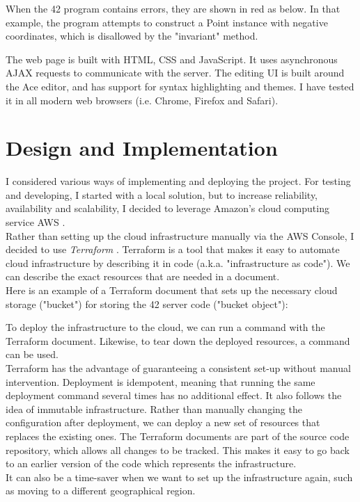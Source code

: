 
When the 42 program contains errors, they are shown in red as below. In that example, the program attempts to construct a Point instance with negative coordinates, which is disallowed by the "invariant" method.


The web page is built with HTML, CSS and JavaScript. It uses asynchronous AJAX requests to communicate with the server. The editing UI is built around the Ace editor, and has support for syntax highlighting and themes. I have tested it in all modern web browsers (i.e. Chrome, Firefox and Safari).

\chapter{Design and Implementation}


I considered various ways of implementing and deploying the project. For testing and developing, I started with a local solution, but to increase reliability, availability and scalability, I decided to leverage Amazon's cloud computing service AWS \cite{amazon-2022A}.
\\[12pt]
Rather than setting up the cloud infrastructure manually via the AWS Console, I decided to use \emph{Terraform} \cite{hashicorp-2022}. Terraform is a tool that makes it easy to automate cloud infrastructure by describing it in code (a.k.a. "infrastructure as code"). We can describe the exact resources that are needed in a document.
\\[12pt]
Here is an example of a Terraform document that sets up the necessary cloud storage ("bucket") for storing the 42 server code ("bucket object"):


To deploy the infrastructure to the cloud, we can run a  command with the Terraform document. Likewise, to tear down the deployed resources, a  command can be used.
\\[12pt]
Terraform has the advantage of guaranteeing a consistent set-up without manual intervention. Deployment is idempotent, meaning that running the same deployment command several times has no additional effect. It also follows the idea of immutable infrastructure. Rather than manually changing the configuration after deployment, we can deploy a new set of resources that replaces the existing ones. The Terraform documents are part of the source code repository, which allows all changes to be tracked. This makes it easy to go back to an earlier version of the code which represents the infrastructure.
\\[12pt]
It can also be a time-saver when we want to set up the infrastructure again, such as moving to a different geographical region.

